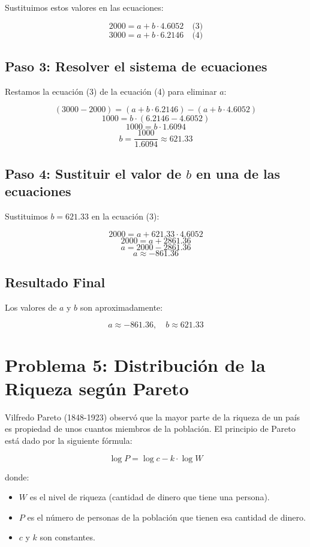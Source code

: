 \documentclass{article}
\begin{document}
Sustituimos estos valores en las ecuaciones:

\[
2000 = a + b \cdot 4.6052 \quad \text{(3)}
\]
\[
3000 = a + b \cdot 6.2146 \quad \text{(4)}
\]

\subsection*{Paso 3: Resolver el sistema de ecuaciones}

Restamos la ecuación (3) de la ecuación (4) para eliminar \(a\):

\[
(3000 - 2000) = (a + b \cdot 6.2146) - (a + b \cdot 4.6052)
\]
\[
1000 = b \cdot (6.2146 - 4.6052)
\]
\[
1000 = b \cdot 1.6094
\]
\[
b = \frac{1000}{1.6094} \approx 621.33
\]

\subsection*{Paso 4: Sustituir el valor de \(b\) en una de las ecuaciones}

Sustituimos \(b = 621.33\) en la ecuación (3):

\[
2000 = a + 621.33 \cdot 4.6052
\]
\[
2000 = a + 2861.36
\]
\[
a = 2000 - 2861.36
\]
\[
a \approx -861.36
\]

\subsection*{Resultado Final}

Los valores de \(a\) y \(b\) son aproximadamente:

\[
a \approx -861.36, \quad b \approx 621.33
\]
\section*{Problema 5: Distribución de la Riqueza según Pareto}

Vilfredo Pareto (1848-1923) observó que la mayor parte de la riqueza de un país es propiedad de unos cuantos miembros de la población. El principio de Pareto está dado por la siguiente fórmula:

\[
\log P = \log c - k \cdot \log W
\]

donde:
\begin{itemize}
    \item \(W\) es el nivel de riqueza (cantidad de dinero que tiene una persona).
    \item \(P\) es el número de personas de la población que tienen esa cantidad de dinero.
    \item \(c\) y \(k\) son constantes.
\end{itemize}
\end{document}
